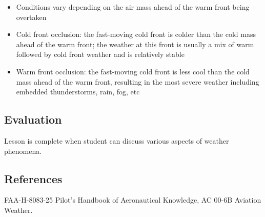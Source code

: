 \begin{itemize}
\begin{itemize}
      \item Conditions vary depending on the air mass ahead of the warm front
        being overtaken

      \item Cold front occlusion: the fast-moving cold front is colder than the
        cold mass ahead of the warm front; the weather at this front is usually
        a mix of warm followed by cold front weather and is relatively stable

      \item Warm front occlusion: the fast-moving cold front is less cool than
        the cold mass ahead of the warm front, resulting in the most severe
        weather including embedded thunderstorms, rain, fog, etc
    \end{itemize}
\end{itemize}

\subsection{Evaluation}

Lesson is complete when student can discuss various aspects of weather phenomena.

\subsection{References}

FAA-H-8083-25 Pilot's Handbook of Aeronautical Knowledge, AC 00-6B Aviation
Weather.

